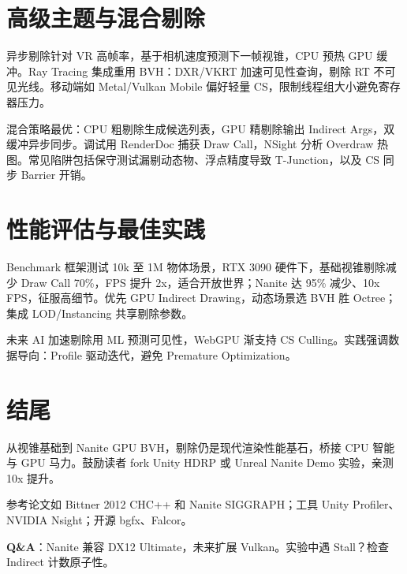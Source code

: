 \chapter{高级主题与混合剔除}
异步剔除针对 VR 高帧率，基于相机速度预测下一帧视锥，CPU 预热 GPU 缓冲。Ray Tracing 集成重用 BVH：DXR/VKRT 加速可见性查询，剔除 RT 不可见光线。移动端如 Metal/Vulkan Mobile 偏好轻量 CS，限制线程组大小避免寄存器压力。\par
混合策略最优：CPU 粗剔除生成候选列表，GPU 精剔除输出 Indirect Args，双缓冲异步同步。调试用 RenderDoc 捕获 Draw Call，NSight 分析 Overdraw 热图。常见陷阱包括保守测试漏剔动态物、浮点精度导致 T-Junction，以及 CS 同步 Barrier 开销。\par
\chapter{性能评估与最佳实践}
Benchmark 框架测试 10k 至 1M 物体场景，RTX 3090 硬件下，基础视锥剔除减少 Draw Call 70\%{}，FPS 提升 2x，适合开放世界；Nanite 达 95\%{} 减少、10x FPS，征服高细节。优先 GPU Indirect Drawing，动态场景选 BVH 胜 Octree；集成 LOD/Instancing 共享剔除参数。\par
未来 AI 加速剔除用 ML 预测可见性，WebGPU 渐支持 CS Culling。实践强调数据导向：Profile 驱动迭代，避免 Premature Optimization。\par
\chapter{结尾}
从视锥基础到 Nanite GPU BVH，剔除仍是现代渲染性能基石，桥接 CPU 智能与 GPU 马力。鼓励读者 fork Unity HDRP 或 Unreal Nanite Demo 实验，亲测 10x 提升。\par
参考论文如 Bittner 2012 CHC++ 和 Nanite SIGGRAPH；工具 Unity Profiler、NVIDIA Nsight；开源 bgfx、Falcor。\par
\textbf{Q\&{}A}：Nanite 兼容 DX12 Ultimate，未来扩展 Vulkan。实验中遇 Stall？检查 Indirect 计数原子性。\par
